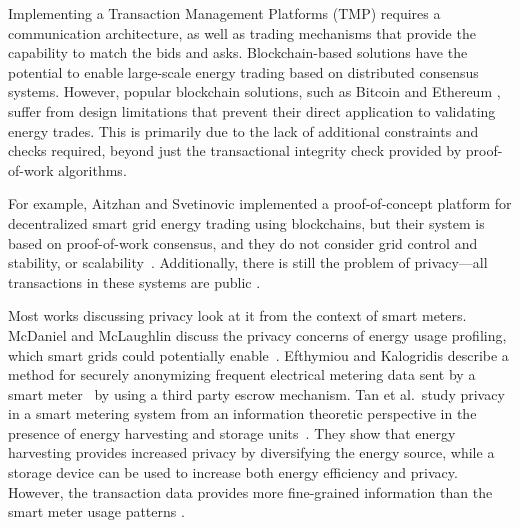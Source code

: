 Implementing a Transaction Management Platforms (TMP) requires a communication architecture, as well as trading mechanisms that provide the capability to match the bids and asks.  Blockchain-based solutions have the potential to enable large-scale energy trading based on distributed consensus systems. However, popular blockchain solutions, such as Bitcoin \cite{Satoshi} and Ethereum \cite{buterin2013ethereum}, suffer from design limitations that prevent their direct application to validating energy trades. This is primarily due to the lack of additional constraints and checks required, beyond just the transactional integrity check provided by proof-of-work algorithms.

For example, Aitzhan and Svetinovic implemented a proof-of-concept platform for decentralized smart grid energy trading using blockchains, but their system is based on proof-of-work consensus, and they do not consider grid control and stability, or scalability~\cite{aitzhan2016security}. Additionally, there is still the problem of privacy---all transactions in these systems are  public \cite{kosba2016hawk}. 

Most works discussing privacy look at it from the context of smart meters. McDaniel and McLaughlin discuss the
privacy concerns of energy usage profiling, which smart grids could
potentially enable~\cite{mcdaniel2009security}. Efthymiou and Kalogridis describe a method for securely anonymizing frequent electrical metering data sent by a smart
meter~\cite{efthymiou2010smart} by using a third party escrow mechanism. Tan et
al.\ study privacy in a smart metering system from an information
theoretic perspective in the presence of energy harvesting and storage
units~\cite{tan2013increasing}. They show that energy harvesting
provides increased privacy by diversifying the energy source, while a
storage device can be used to increase both energy efficiency and
privacy. However, the transaction data provides more fine-grained information than the smart meter usage patterns \cite{Privacy2017}. 


